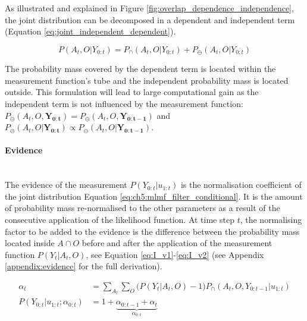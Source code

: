 As illustrated and explained in Figure \ref{fig:overlap_dependence_independence}, the joint distribution can be decomposed in a 
dependent and independent term (Equation \ref{eq:joint_independent_dependent}). 

\begin{equation}\label{eq:joint_independent_dependent}
 P(A_t,O|Y_{0:t}) = P_{\cap}(A_t,O|Y_{0:t}) + P_{\ominus}(A_t,O|Y_{0:t})
\end{equation}

The probability mass covered by the dependent term is located within the measurement function's tube and the independent probability mass 
is located outside. This formulation will lead to large computational gain 
as the independent term is not influenced by the measurement function: 
$P_{\ominus}(A_t,O,\mathbf{Y_{0:t}}) = P_{\ominus}(A_t,O,\mathbf{Y_{0:t-1}})$ and 
$P_{\ominus}(A_t,O|\mathbf{Y_{0:t}}) \propto P_{\ominus}(A_t,O|\mathbf{Y_{0:t-1}})$.

\paragraph{Evidence}\\
The evidence of the measurement $P(Y_{0:t}|u_{1:t})$ is the normalisation coefficient of the joint distribution Equation \ref{eq:ch5:mlmf_filter_conditional}.
It is the amount of probability mass re-normalised to the other parameters as a result of the consecutive application of the likelihood function.
At time step $t$, the normalising factor to be added to the evidence is the difference between the probability mass located 
inside $A\cap O$ before and after the application of the measurement function $P(Y_t|A_t,O)$, 
see Equation \ref{eq:I_v1}-\ref{eq:I_v2} (see Appendix \ref{appendix:evidence} for the full derivation).

\begin{align}
 \alpha_t 			 	&= \sum\limits_{A_t}\sum\limits_{O} \Big(P(Y_t|A_t,O) - 1\Big)P_{\cap}(A_t,O,Y_{0:t-1}|u_{1:t}) \label{eq:I_v1} \\
 P(Y_{0:t}|u_{1:t};\alpha_{0:t})        &= 1 + \underbrace{\alpha_{0:t-1} + \alpha_t}_{\alpha_{0:t}} \label{eq:I_v2}
\end{align}

